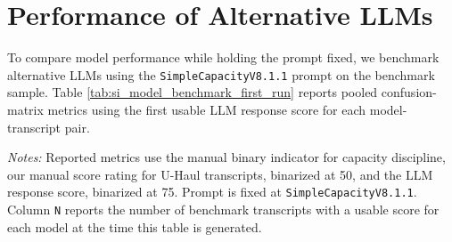\section{Performance of Alternative LLMs}

To compare model performance while holding the prompt fixed, we benchmark alternative LLMs using the \texttt{SimpleCapacityV8.1.1} prompt on the benchmark sample. Table \ref{tab:si_model_benchmark_first_run} reports pooled confusion-matrix metrics using the first usable LLM response score for each model-transcript pair.

\begin{table}[ht]
    \centering
    \caption{Model Benchmarking Against Human Ratings (First LLM Run)}
    \label{tab:si_model_benchmark_first_run}
    \setlength{\tabcolsep}{3pt}
    \scriptsize
    \resizebox{\textwidth}{!}{}
    \begin{minipage}{\textwidth}
        \vspace{1em}
        \footnotesize
        \textit{Notes:} Reported metrics use the \textcite{aryal2022coordinated} manual binary indicator for capacity discipline, our manual score rating for U-Haul transcripts, binarized at 50, and the LLM response score, binarized at 75. Prompt is fixed at \texttt{SimpleCapacityV8.1.1}. Column \texttt{N} reports the number of benchmark transcripts with a usable score for each model at the time this table is generated.
    \end{minipage}
\end{table}
\FloatBarrier
